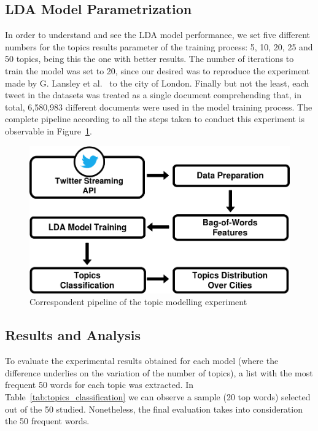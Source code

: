 \subsection{LDA Model Parametrization}
In order to understand and see the LDA model performance, we set five different numbers for the topics results parameter of the training process: 5, 10, 20, 25 and 50 topics, being this the one with better results. The number of iterations to train the model was set to 20, since our desired was to reproduce the experiment made by G. Lansley et al.~\cite{lansley2016geography} to the city of London. Finally but not the least, each tweet in the datasets was treated as a single document comprehending that, in total, 6,580,983 different documents were used in the model training process. The complete pipeline according to all the steps taken to conduct this experiment is observable in Figure~\ref{fig:pipeline_lda}.

\begin{figure}[h]
\centering
\includegraphics[width=0.6\linewidth]{figures/pipeline_lda.png}
\caption{Correspondent pipeline of the topic modelling experiment}
\label{fig:pipeline_lda}
\end{figure}

\subsection{Results and Analysis}
To evaluate the experimental results obtained for each model (where the difference underlies on the variation of the number of topics), a list with the most frequent 50 words for each topic was extracted. In Table~\ref{tab:topics_classification} we can observe a sample (20 top words) selected out of the 50 studied. Nonetheless, the final evaluation takes into consideration the 50 frequent words.


